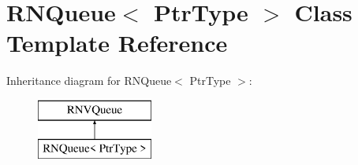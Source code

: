 \hypertarget{class_r_n_queue}{}\section{R\+N\+Queue$<$ Ptr\+Type $>$ Class Template Reference}
\label{class_r_n_queue}
Inheritance diagram for R\+N\+Queue$<$ Ptr\+Type $>$\+:\begin{figure}[H]
\begin{center}
\leavevmode
\includegraphics[height=2.000000cm]{class_r_n_queue}
\end{center}
\end{figure}
